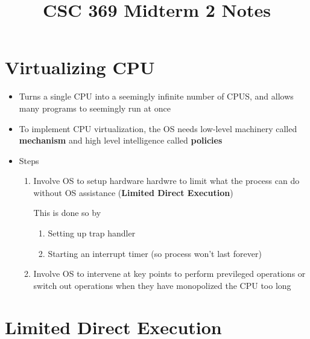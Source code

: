 \documentclass[12pt]{article}
\begin{document}
\title{CSC 369 Midterm 2 Notes}

\section{Virtualizing CPU}

\begin{itemize}
    \item Turns a single CPU into a seemingly infinite number of CPUS, and
    allows many programs to seemingly run at once
    \item To implement CPU virtualization, the OS needs low-level machinery
    called \textbf{mechanism} and high level intelligence called \textbf{policies}
    \item Steps

    \begin{enumerate}[1.]
        \item Involve OS to setup hardware hardwre to limit what the process can do without OS assistance
        (\textbf{Limited Direct Execution})

        \bigskip

        This is done so by

        \bigskip

        \begin{enumerate}[1.]
            \item Setting up trap handler
            \item Starting an interrupt timer (so process won't last forever)
        \end{enumerate}
        \item Involve OS to intervene at key points to perform previleged operations
        or switch out operations when they have monopolized the CPU too long
    \end{enumerate}
    \bigskip
\end{itemize}

\section{Limited Direct Execution}
\end{document}

